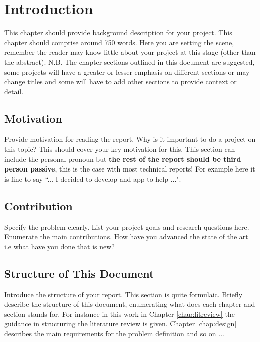 \chapter{Introduction}
\label{chap:intro}

This chapter should provide background description for your project. This chapter should comprise around 750 words. Here you are setting the scene, remember the reader may know little about your project at this stage (other than the abstract). N.B. The chapter sections outlined in this document are suggested, some projects will have a greater or lesser emphasis on different sections or may change titles and some will have to add other sections to provide context or detail.

\section{Motivation}
Provide motivation for reading the report. Why is it important to do a project on this topic? This should cover your key motivation for this. This section can include the personal pronoun but \textbf{the rest of the report should be third person passive}, this is the case with most technical reports! For example here it is fine to say ``... I decided to develop and app to help ...".

\section{Contribution}
Specify the problem clearly. List your project goals and research questions here. Enumerate the main contributions. How have you advanced the state of the art i.e what have you done that is new?

\section{Structure of This Document}
Introduce the structure of your report. This section is quite formulaic. Briefly describe the structure of this document, enumerating what does each chapter and section stands for. For instance in this work in Chapter \ref{chap:litreview} the guidance in structuring the literature review is given. Chapter \ref{chap:design} describes the main requirements for the problem definition and so on ...